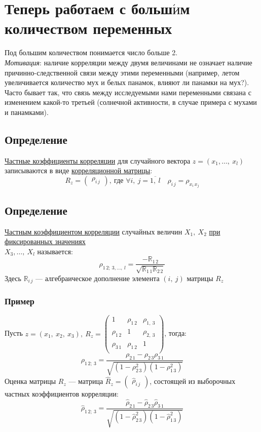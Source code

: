 \documentclass[12pt, a4paper]{article}
\begin{document}
\section*{Теперь работаем с больш$\acute{\textbf{и}}$м количеством переменных}
Под большим количеством понимается число больше 2.\\
\textit{Мотивация}: наличие корреляции между двумя величинами не означает наличие причинно-следственной связи между этими переменными (например, летом увеличивается количество мух и белых панамок, влияют ли панамки на мух?). Часто бывает так, что связь между исследуемыми нами переменными связана с изменением какой-то третьей (солнечной активности, в случае примера с мухами и панамками).
\subsection*{Определение}
\underline{Частные коэффициенты корреляции} для случайного вектора $z = (x_1,\dots,\ x_l)$ записываются в виде \underline{корреляционной матрицы}:
\[
R_z = \begin{pmatrix}
    \rho_{i\, j}
\end{pmatrix},\ \text{где } \forall i,\ j = \overline{1,\ l}\quad \rho_{i\, j} = \rho_{x_i\, x_j}
\]
\subsection*{Определение}
\underline{Частным коэффициентом корреляции} случайных величин $X_1,\ X_2$ \underline{при фиксированных значениях}\\
$X_3,\dots,\ X_l$ называется:
\[
\rho_{1\, 2;\ 3,\dots,\ l} = \frac{-\mathbb{R}_{1\, 2}}{\sqrt{\mathbb{R}_{1\, 1}\mathbb{R}_{2\, 2} }}
\]
Здесь $\mathbb{R}_{i\, j}$ --- алгебраическое дополнение элемента $(i,\ j)$ матрицы $R_z$\\
\subsubsection*{Пример}
Пусть $z = (x_1,\ x_2,\ x_3),\ R_z = \begin{pmatrix}
    1 & \rho_{1\, 2} & \rho_{1,\ 3}\\
    \rho_{1\, 2} & 1 & \rho_{2,\ 3}\\
    \rho_{3\, 1} & \rho_{1\, 2} & 1\\
\end{pmatrix}$, тогда:
\[
\rho_{1\, 2;\ 3} = \frac{\rho_{2\, 1} - \rho_{2\, 3}\rho_{3\, 1}}{\sqrt{ (1 - \rho_{2\, 3}^2) (1 - \rho_{1\, 3}^2) }}
\]
Оценка матрицы $R_z$ --- матрица $\hat R_z = \begin{pmatrix}
    \hat \rho_{i\, j}
\end{pmatrix}$, состоящей из выборочных частных коэффициентов корреляции:
\[
\hat \rho_{1\, 2;\ 3} = \frac{\hat \rho_{2\, 1} - \hat\rho_{2\, 3} \hat\rho_{3\, 1}}{\sqrt{ (1 - \hat\rho_{2\, 3}^2) (1 - \hat\rho_{1\, 3}^2) }}
\]
\end{document}
